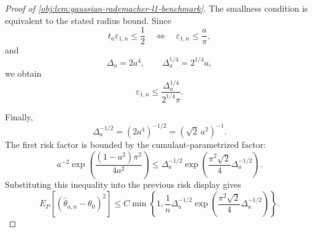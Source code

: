 \begin{proof}[Proof of \cref{obj:lem:gaussian-rademacher-l1-benchmark}]
The smallness condition is equivalent to the stated radius bound.  Since
\[
t_a\varepsilon_{1,n}\le\frac12
\quad\Longleftrightarrow\quad
\varepsilon_{1,n}\le\frac{a}{\pi},
\]
and
\[
\Delta_a=2a^4,
\qquad
\Delta_a^{1/4}=2^{1/4}a,
\]
we obtain
\[
\varepsilon_{1,n}
\le
\frac{\Delta_a^{1/4}}{2^{1/4}\pi}.
\]

Finally,
\[
\Delta_a^{-1/2}
=
(2a^4)^{-1/2}
=
(\sqrt2\,a^2)^{-1}.
\]
The first risk factor is bounded by the cumulant-parametrized factor:
\[
a^{-2}\exp\!\left(\frac{(1-a^2)\pi^2}{4a^2}\right)
\le
\Delta_a^{-1/2}
\exp\!\left(\frac{\pi^2\sqrt2}{4}\Delta_a^{-1/2}\right).
\]
Substituting this inequality into the previous risk display gives
\[
E_P[(\widehat\theta_{a,n}-\theta_0)^2]
\le
C\min\!\left\{
1,\frac1n\Delta_a^{-1/2}
\exp\!\left(\frac{\pi^2\sqrt2}{4}\Delta_a^{-1/2}\right)
\right\}.
\]
\end{proof}
